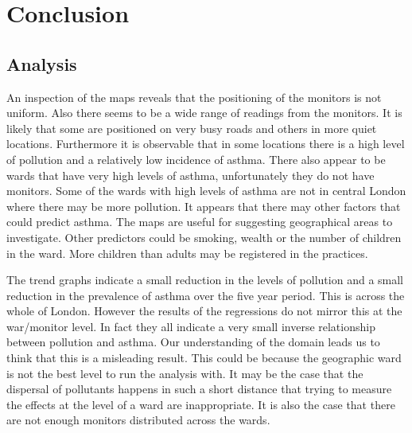 
\chapter{Conclusion} %

\label{Chapter6} %





\section{Analysis}

An inspection of the maps reveals that the positioning of the monitors is not uniform. Also there seems to be a wide range of readings from the monitors. It is likely that some are positioned on very busy roads and others in more quiet locations. Furthermore it is observable that in some locations there is a high level of pollution and a relatively low incidence of asthma. There also appear to be wards that have very high levels of asthma, unfortunately they do not have monitors. Some of the wards with high levels of asthma are not in central London where there may be more pollution. It appears that there may other factors that could predict asthma. The maps are useful for suggesting geographical areas to investigate. Other predictors could be smoking, wealth or the number of children in the ward. More children than adults may be registered in the practices.

The trend graphs indicate a small reduction in the levels of pollution and a small reduction in the prevalence of asthma over the five year period. This is across the whole of London. However the results of the regressions do not mirror this at the war/monitor level. In fact they all indicate a very small inverse relationship between pollution and asthma. Our understanding of the domain leads us to think that this is a misleading result. This could be because the geographic ward is not the best level to run the analysis with. It may be the case that the dispersal of pollutants happens in such a short distance that trying to measure the effects at the level of a ward are inappropriate. It is also the case that there are not enough monitors distributed across the wards.

